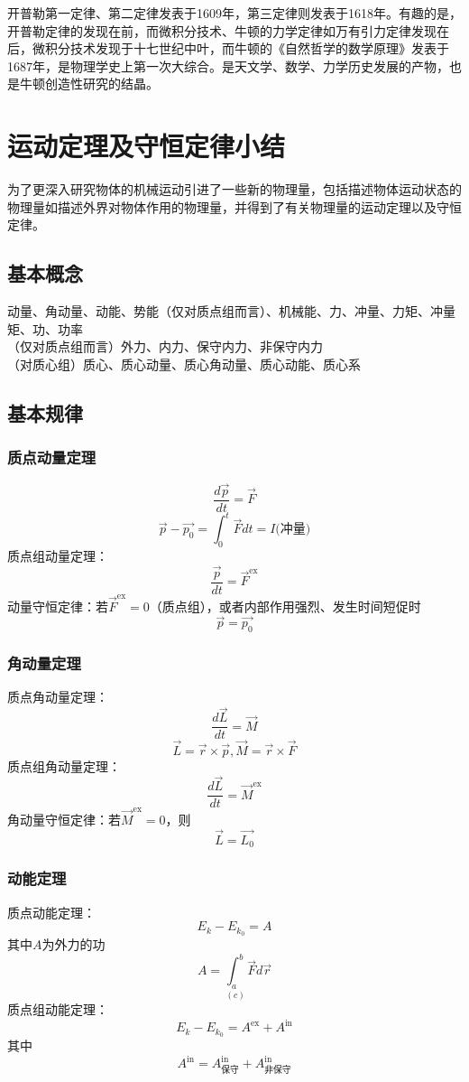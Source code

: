开普勒第一定律、第二定律发表于1609年，第三定律则发表于1618年。有趣的是，开普勒定律的发现在前，而微积分技术、牛顿的力学定律如万有引力定律发现在后，微积分技术发现于十七世纪中叶，而牛顿的《自然哲学的数学原理》发表于1687年，是物理学史上第一次大综合。是天文学、数学、力学历史发展的产物，也是牛顿创造性研究的结晶。
\section{运动定理及守恒定律小结}
为了更深入研究物体的机械运动引进了一些新的物理量，包括描述物体运动状态的物理量如描述外界对物体作用的物理量，并得到了有关物理量的运动定理以及守恒定律。
\subsection{基本概念}
\begin{center}
动量、角动量、动能、势能（仅对质点组而言）、机械能、力、冲量、力矩、冲量矩、功、功率\\
（仅对质点组而言）外力、内力、保守内力、非保守内力\\
（对质心组）质心、质心动量、质心角动量、质心动能、质心系\\
\end{center}
\subsection{基本规律}
\subsubsection{质点动量定理}
 \[\frac{d\vec{p}}{dt}=\vec{F}\]
\[ \vec{p}-\vec{p_0}=\int_0^t\vec{F}dt=I\text{(冲量)} \]
质点组动量定理：\[\frac{\vec{p}}{dt}=\vec{F}^\text{ex}\]
动量守恒定律：若$\vec{F}^\text{ex}=0$（质点组），或者内部作用强烈、发生时间短促时\[\vec{p}=\vec{p_0}\]
\subsubsection{角动量定理}
质点角动量定理：\[\frac{d\vec{L}}{dt}=\vec{M}\]\[\vec{L}=\vec{r}\times\vec{p},\vec{M}=\vec{r}\times\vec{F}\]
质点组角动量定理：\[\frac{d\vec{L}}{dt}=\vec{M}^\text{ex}\]
角动量守恒定律：若$\vec{M}^\text{ex}=0$，则\[\vec{L}=\vec{L_0}\]
\subsubsection{动能定理}
质点动能定理：\[E_k-E_{k_0}=A\]
其中$A$为外力的功
\[A=\underset{(c)}{\int_a^b}\vec{F}d\vec{r}\]
质点组动能定理：
\[E_k-E_{k_0}=A^\text{ex}+A^\text{in}\]其中\[A^\text{in}=A^\text{in}_\text{保守}+A^\text{in}_\text{非保守}\]
